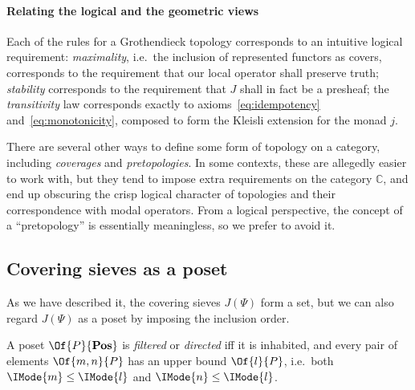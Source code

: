 \documentclass{article}
\newcommand\Posets{\mathbf{Pos}}
\begin{document}
\paragraph{Relating the logical and the geometric views}

Each of the rules for a Grothendieck topology corresponds to an
intuitive logical requirement: \emph{maximality}, i.e.\ the inclusion
of represented functors as covers, corresponds to the requirement that
our local operator shall preserve truth; \emph{stability} corresponds
to the requirement that $J$ shall in fact be a presheaf; the
\emph{transitivity} law corresponds exactly to
axioms~\ref{eq:idempotency} and~\ref{eq:monotonicity}, composed to
form the Kleisli extension for the monad $j$.

\begin{remark}
  There are several other ways to define some form of topology on a
  category, including \emph{coverages} and \emph{pretopologies}. In
  some contexts, these are allegedly easier to work with, but they
  tend to impose extra requirements on the category $\mathbb{C}$, and
  end up obscuring the crisp logical character of topologies and their
  correspondence with modal operators. From a logical perspective, the
  concept of a ``pretopology'' is essentially meaningless, so we
  prefer to avoid it.
\end{remark}

\subsection{Covering sieves as a poset}
\newcommand\IsLEQ[2]{\IMode{#1}\leq\IMode{#2}}

As we have described it, the covering sieves $J(\Psi)$ form a set, but
we can also regard $J(\Psi)$ as a poset by imposing the inclusion
order.

\begin{definition}
  A poset $\Of{P}{\Posets}$ is \emph{filtered} or \emph{directed} iff
  it is inhabited, and every pair of elements $\Of{m,n}{P}$ has an
  upper bound $\Of{l}{P}$, i.e.\ both $\IsLEQ{m}{l}$ and
  $\IsLEQ{n}{l}$.
\end{definition}
\end{document}
